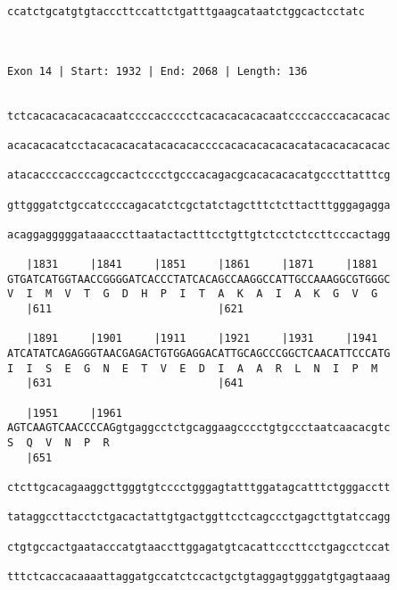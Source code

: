 \documentclass{article}
\begin{document}
\begin{Verbatim}
ccatctgcatgtgtacccttccattctgatttgaagcataatctggcactcctatc
                                                        
                                                        
 
Exon 14 | Start: 1932 | End: 2068 | Length: 136


tctcacacacacacacaatccccaccccctcacacacacacaatccccacccacacacac
                                                            
acacacacatcctacacacacatacacacaccccacacacacacacatacacacacacac
                                                            
atacaccccaccccagccactcccctgcccacagacgcacacacacatgcccttatttcg
                                                            
gttgggatctgccatccccagacatctcgctatctagctttctcttactttgggagagga
                                                            
acaggagggggataaacccttaatactactttcctgttgtctcctctccttcccactagg
                                                            
   |1831     |1841     |1851     |1861     |1871     |1881  
GTGATCATGGTAACCGGGGATCACCCTATCACAGCCAAGGCCATTGCCAAAGGCGTGGGC
V  I  M  V  T  G  D  H  P  I  T  A  K  A  I  A  K  G  V  G  
   |611                          |621                       
  
   |1891     |1901     |1911     |1921     |1931     |1941  
ATCATATCAGAGGGTAACGAGACTGTGGAGGACATTGCAGCCCGGCTCAACATTCCCATG
I  I  S  E  G  N  E  T  V  E  D  I  A  A  R  L  N  I  P  M  
   |631                          |641                       
  
   |1951     |1961                                          
AGTCAAGTCAACCCCAGgtgaggcctctgcaggaagcccctgtgccctaatcaacacgtc
S  Q  V  N  P  R                                            
   |651                                                     
  
ctcttgcacagaaggcttgggtgtcccctgggagtatttggatagcatttctgggacctt
                                                            
tataggccttacctctgacactattgtgactggttcctcagccctgagcttgtatccagg
                                                            
ctgtgccactgaatacccatgtaaccttggagatgtcacattcccttcctgagcctccat
                                                            
tttctcaccacaaaattaggatgccatctccactgctgtaggagtgggatgtgagtaaag
                                                            

\end{Verbatim}
\end{document}
